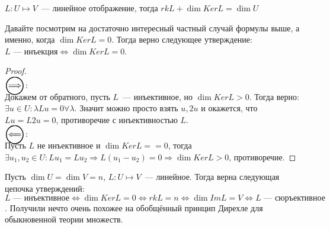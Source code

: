 \begin{follow}
    $L: U\mapsto V$~--- линейное отображение, тогда $rk L + \dim Ker L = \dim U$
\end{follow}
\begin{remark}
    Давайте посмотрим на достаточно интересный частный случай формулы выше, а именно, когда
    $\dim Ker L = 0$. Тогда верно следующее утверждение: $L\text{~--- инъекция} \Leftrightarrow \dim Ker L = 0$.
\end{remark}
\begin{proof}\leavevmode\\
    $\ora$:\\
        Докажем от обратного, пусть $L$~--- инъективное, но $\dim Ker L > 0$.
        Тогда верно: $\exists u\in U\colon \lambda Lu = 0 \forall \lambda$.
        Значит можно просто взять $u, 2u$ и окажется, что  $Lu = L2u = 0$, 
        противоречие с инъективностью $L$.
    \\$\ola$:\\
        Пусть $L$ не инъективное и $\dim Ker L == 0$, тогда $\exists u_1, u_2\in U\colon Lu_1 = Lu_2\Rightarrow
        L(u_1 - u_2) = 0 \Rightarrow \dim Ker L > 0$, противоречие. 
\end{proof} 
\begin{follow}
    Пусть $\dim U = \dim V = n$, $L: U\mapsto V$~--- линейное.
    Тогда верна следующая цепочка утверждений:
    $$L\text{~--- инъективное} \Leftrightarrow \dim Ker L = 0 \Leftrightarrow rk L = n \Leftrightarrow 
    \dim Im L = V \Leftrightarrow L\text{~--- сюръективное}$$.
    Получили нечто очень похожее на обобщённый принцип Дирехле для обыкновенной теории множеств.
\end{follow}

